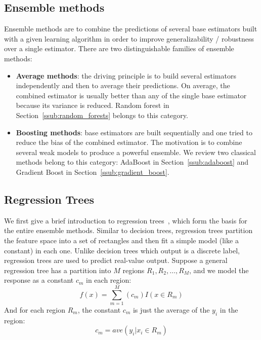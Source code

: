 \subsection{Ensemble methods}
\label{sub:ensemble_methods}
Ensemble methods are to combine the predictions of several base estimators built with a given learning algorithm in order to improve generalizability / robustness over a single estimator.
There are two distinguishable families of ensemble methods:
\begin{itemize}
	\item \textbf{Average methods}: the driving principle is to build several estimators independently and then to average their predictions. On average, the combined estimator is usually better than any of the single base estimator because its variance is reduced. Random forest in Section~\ref{ssub:random_forests} belongs to this category.
	\item \textbf{Boosting methods}: base estimators are built sequentially and one tried to reduce the bias of the combined estimator. The motivation is to combine several weak models to produce a powerful ensemble. We review two classical methods belong to this category: AdaBoost in Section~\ref{ssub:adaboost} and Gradient Boost in Section~\ref{ssub:gradient_boost}.
\end{itemize}

\subsection{Regression Trees}
\label{ssub:regression_tree}
We first give a brief introduction to regression trees~\cite{hastie2009elements}, which form the basis for the entire ensemble methods.
Similar to decision trees, regression trees partition the feature space into a set of rectangles and then fit a simple model (like a constant) in each one.
Unlike decision trees which output is a discrete label, regression trees are used to predict real-value output.
Suppose a general regression tree has a partition into $M$ regions $R_1, R_2, \ldots, R_M$, and we model the response as a constant $c_m$ in each region:
\begin{equation}
	f(x) = \sum \limits_{m=1}^{M} (c_m)I(x \in R_m)
\end{equation}
And for each region $R_m$, the constant $c_m$ is just the average of the $y_i$ in the region:
\begin{equation}
	c_m  = ave(y_i | x_i \in R_m)
\end{equation}

